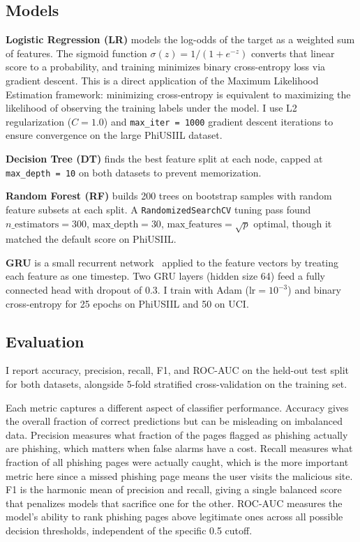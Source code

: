 \documentclass{article}
\begin{document}
\subsection{Models}

\textbf{Logistic Regression (LR)} models the log-odds of the target as a weighted sum of features. The sigmoid function $\sigma(z) = 1/(1+e^{-z})$ converts that linear score to a probability, and training minimizes binary cross-entropy loss via gradient descent. This is a direct application of the Maximum Likelihood Estimation framework: minimizing cross-entropy is equivalent to maximizing the likelihood of observing the training labels under the model. I use L2 regularization ($C = 1.0$) and \texttt{max\_iter = 1000} gradient descent iterations to ensure convergence on the large PhiUSIIL dataset.

\textbf{Decision Tree (DT)} finds the best feature split at each node, capped at \texttt{max\_depth = 10} on both datasets to prevent memorization.

\textbf{Random Forest (RF)} builds 200 trees on bootstrap samples with random feature subsets at each split.
A \texttt{RandomizedSearchCV} tuning pass found $n\_\text{estimators} = 300$, $\text{max\_depth} = 30$, $\text{max\_features} = \sqrt{p}$ optimal, though it matched the default score on PhiUSIIL.

\textbf{GRU} is a small recurrent network~\cite{cho2014} applied to the feature vectors by treating each feature as one timestep.
Two GRU layers (hidden size 64) feed a fully connected head with dropout of 0.3.
I train with Adam ($\text{lr} = 10^{-3}$) and binary cross-entropy for 25 epochs on PhiUSIIL and 50 on UCI.

\subsection{Evaluation}

I report accuracy, precision, recall, F1, and ROC-AUC on the held-out test split for both datasets, alongside 5-fold stratified cross-validation on the training set.

Each metric captures a different aspect of classifier performance.
Accuracy gives the overall fraction of correct predictions but can be misleading on imbalanced data.
Precision measures what fraction of the pages flagged as phishing actually are phishing, which matters when false alarms have a cost.
Recall measures what fraction of all phishing pages were actually caught, which is the more important metric here since a missed phishing page means the user visits the malicious site.
F1 is the harmonic mean of precision and recall, giving a single balanced score that penalizes models that sacrifice one for the other.
ROC-AUC measures the model's ability to rank phishing pages above legitimate ones across all possible decision thresholds, independent of the specific 0.5 cutoff.
\end{document}
